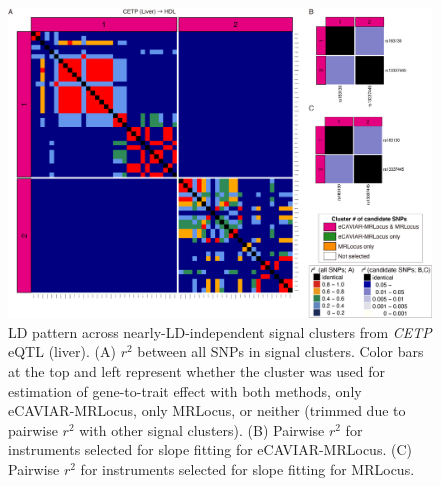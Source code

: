 \documentclass[11pt]{article}
\begin{document}
\begin{figure}[!ht]
  \centering
  \includegraphics[width=\textwidth]{figs/region/heatmap_eQTLbase.Liver_CETP_HDL.20210114.png}
  \caption{LD pattern across nearly-LD-independent signal clusters
    from \emph{CETP} eQTL (liver).
    (A) $r^2$ between all SNPs in signal clusters. Color bars at the
    top and left represent whether the cluster was used for estimation of
    gene-to-trait effect with both methods, only eCAVIAR-MRLocus, only
    MRLocus, or neither (trimmed due to pairwise $r^2$ with other
    signal clusters). (B) Pairwise $r^2$ for instruments selected for
    slope fitting for eCAVIAR-MRLocus. (C) Pairwise $r^2$ for
    instruments selected for slope fitting for MRLocus.}
\end{figure}
\end{document}
